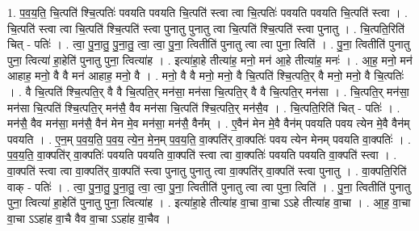 \documentclass[17pt]{extarticle}
\begin{document}
1. प॒व॒य॒ति॒ चि॒त्पति॑ श्चि॒त्पतिः॑ पवयति पवयति चि॒त्पति॑ स्त्वा त्वा चि॒त्पतिः॑ पवयति पवयति चि॒त्पति॑ स्त्वा । . चि॒त्पति॑ स्त्वा त्वा चि॒त्पति॑ श्चि॒त्पति॑ स्त्वा पुनातु पुनातु त्वा चि॒त्पति॑ श्चि॒त्पति॑ स्त्वा पुनातु । . चि॒त्पति॒रिति॑ चित् - पतिः॑ । . त्वा॒ पु॒ना॒तु॒ पु॒ना॒तु॒ त्वा॒ त्वा॒ पु॒ना॒ त्वितीति॑ पुनातु त्वा त्वा पुना॒ त्विति॑ । . पु॒ना॒ त्वितीति॑ पुनातु पुना॒ त्वित्या॑ हा॒हेति॑ पुनातु पुना॒ त्वित्या॑ह । . इत्या॑हा॒हे तीत्या॑ह॒ मनो॒ मन॑ आ॒हे तीत्या॑ह॒ मनः॑ । . आ॒ह॒ मनो॒ मन॑ आहाह॒ मनो॒ वै वै मन॑ आहाह॒ मनो॒ वै । . मनो॒ वै वै मनो॒ मनो॒ वै चि॒त्पति॑ श्चि॒त्पति॒र् वै मनो॒ मनो॒ वै चि॒त्पतिः॑ । . वै चि॒त्पति॑ श्चि॒त्पति॒र् वै वै चि॒त्पति॒र् मन॑सा॒ मन॑सा चि॒त्पति॒र् वै वै चि॒त्पति॒र् मन॑सा । . चि॒त्पति॒र् मन॑सा॒ मन॑सा चि॒त्पति॑ श्चि॒त्पति॒र् मन॑सै॒ वैव मन॑सा चि॒त्पति॑ श्चि॒त्पति॒र् मन॑सै॒व । . चि॒त्पति॒रिति॑ चित् - पतिः॑ । . मन॑सै॒ वैव मन॑सा॒ मन॑सै॒ वैन॑ मेन मे॒व मन॑सा॒ मन॑सै॒ वैन᳚म् । . ए॒वैन॑ मेन मे॒वै वैन॑म् पवयति पवय त्येन मे॒वै वैन॑म् पवयति । . ए॒न॒म् प॒व॒य॒ति॒ प॒व॒य॒ त्ये॒न॒ मे॒न॒म् प॒व॒य॒ति॒ वा॒क्पति॑र् वा॒क्पतिः॑ पवय त्येन मेनम् पवयति वा॒क्पतिः॑ । . प॒व॒य॒ति॒ वा॒क्पति॑र् वा॒क्पतिः॑ पवयति पवयति वा॒क्पति॑ स्त्वा त्वा वा॒क्पतिः॑ पवयति पवयति वा॒क्पति॑ स्त्वा । . वा॒क्पति॑ स्त्वा त्वा वा॒क्पति॑र् वा॒क्पति॑ स्त्वा पुनातु पुनातु त्वा वा॒क्पति॑र् वा॒क्पति॑ स्त्वा पुनातु । . वा॒क्पति॒रिति॑ वाक् - पतिः॑ । . त्वा॒ पु॒ना॒तु॒ पु॒ना॒तु॒ त्वा॒ त्वा॒ पु॒ना॒ त्वितीति॑ पुनातु त्वा त्वा पुना॒ त्विति॑ । . पु॒ना॒ त्वितीति॑ पुनातु पुना॒ त्वित्या॑ हा॒हेति॑ पुनातु पुना॒ त्वित्या॑ह । . इत्या॑हा॒हे तीत्या॑ह वा॒चा वा॒चा ऽऽहे तीत्या॑ह वा॒चा । . आ॒ह॒ वा॒चा वा॒चा ऽऽहा॑ह वा॒चै वैव वा॒चा ऽऽहा॑ह वा॒चैव । \newline
\end{document}
